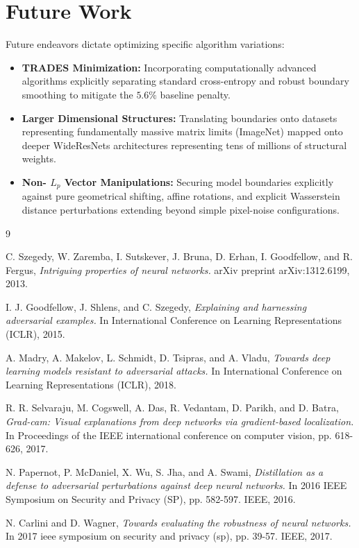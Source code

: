 \documentclass[12pt,a4paper]{article}
\begin{document}
\section{Future Work}
Future endeavors dictate optimizing specific algorithm variations:
\begin{itemize}
    \item \textbf{TRADES Minimization:} Incorporating computationally advanced algorithms explicitly separating standard cross-entropy and robust boundary smoothing to mitigate the $5.6\%$ baseline penalty.
    \item \textbf{Larger Dimensional Structures:} Translating boundaries onto datasets representing fundamentally massive matrix limits (ImageNet) mapped onto deeper WideResNets architectures representing tens of millions of structural weights. 
    \item \textbf{Non- $L_p$ Vector Manipulations:} Securing model boundaries explicitly against pure geometrical shifting, affine rotations, and explicit Wasserstein distance perturbations extending beyond simple pixel-noise configurations.
\end{itemize}

\begin{thebibliography}{9}

C. Szegedy, W. Zaremba, I. Sutskever, J. Bruna, D. Erhan, I. Goodfellow, and R. Fergus,
\textit{Intriguing properties of neural networks.}
arXiv preprint arXiv:1312.6199, 2013.

I. J. Goodfellow, J. Shlens, and C. Szegedy,
\textit{Explaining and harnessing adversarial examples.}
In International Conference on Learning Representations (ICLR), 2015.

A. Madry, A. Makelov, L. Schmidt, D. Tsipras, and A. Vladu,
\textit{Towards deep learning models resistant to adversarial attacks.}
In International Conference on Learning Representations (ICLR), 2018.

R. R. Selvaraju, M. Cogswell, A. Das, R. Vedantam, D. Parikh, and D. Batra,
\textit{Grad-cam: Visual explanations from deep networks via gradient-based localization.}
In Proceedings of the IEEE international conference on computer vision, pp. 618-626, 2017.

N. Papernot, P. McDaniel, X. Wu, S. Jha, and A. Swami,
\textit{Distillation as a defense to adversarial perturbations against deep neural networks.}
In 2016 IEEE Symposium on Security and Privacy (SP), pp. 582-597. IEEE, 2016.

N. Carlini and D. Wagner,
\textit{Towards evaluating the robustness of neural networks.}
In 2017 ieee symposium on security and privacy (sp), pp. 39-57. IEEE, 2017.

\end{thebibliography}
\end{document}
